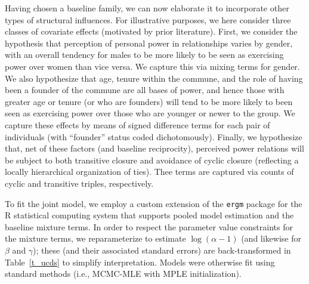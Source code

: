 \documentclass[11pt]{article}
\begin{document}
Having chosen a baseline family, we can now elaborate it to incorporate other types of structural influences.  For illustrative purposes, we here consider three classes of covariate effects (motivated by prior literature).  First, we consider the hypothesis that perception of personal power in relationships varies by gender, with an overall tendency for males to be more likely to be seen as exercising power over women than vice versa.  We capture this via mixing terms for gender.  We also hypothesize that age, tenure within the commune, and the role of having been a founder of the commune are all bases of power, and hence those with greater age or tenure (or who are founders) will tend to be more likely to been seen as exercising power over those who are younger or newer to the group.  We capture these effects by means of signed difference terms for each pair of individuals (with ``founder'' status coded dichotomously).  Finally, we hypothesize that, net of these factors (and baseline reciprocity), perceived power relations will be subject to both transitive closure and avoidance of cyclic closure (reflecting a locally hierarchical organization of ties).  Thee terms are captured via counts of cyclic and transitive triples, respectively.

To fit the joint model, we employ a custom extension of the \texttt{ergm} \citep{hunter.et.al:jss:2008} package for the \textsf{R} statistical computing system \citep{rteam:sw:2014} that supports pooled model estimation and the baseline mixture terms.  In order to respect the parameter value constraints for the mixture terms, we reparameterize to estimate $\log\left(\alpha-1\right)$ (and likewise for $\beta$ and $\gamma$); these (and their associated standard errors) are back-transformed in Table~\ref{t_ucds} to simplify interpretation.   Models were otherwise fit using standard methods (i.e., MCMC-MLE with MPLE initialization).
\end{document}
